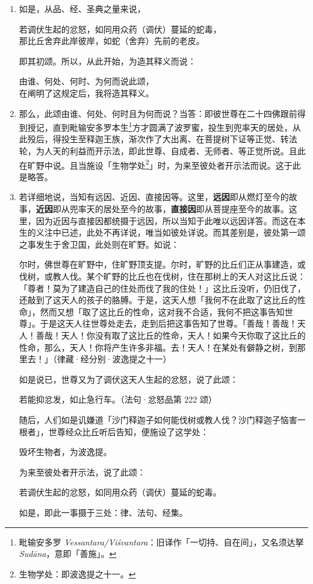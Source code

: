 \begin{enumerate}\item 如是，从品、经、圣典之量来说，\begin{quoting}若调伏生起的忿怒，如同用众药（调伏）蔓延的蛇毒，\\那比丘舍弃此岸彼岸，如蛇（舍弃）先前的老皮。\end{quoting}即其初颂。所以，从此开始，为造其释义而说：\begin{quoting}由谁、何处、何时、为何而说此颂，\\在阐明了这规定后，我将造其释义。\end{quoting}
\item 那么，此颂由谁、何处、何时且为何而说？当答：即彼世尊在二十四佛跟前得到授记，直到毗输安多罗本生\footnote{毗输安多罗 \textit{Vessantara/Viśvantara}：旧译作「一切持、自在间」，又名须达拏 \textit{Sudāna}，意即「善施」。}方才圆满了波罗蜜，投生到兜率天的居处，从此殁后，得投生至释迦王族，渐次作了大出离、在菩提树下证等正觉、转法轮，为人天的利益而开示法，即此世尊、自成者、无师者、等正觉所说。且此在旷野中说。且当施设「生物学处\footnote{生物学处：即波逸提之十一。}」时，为来至彼处者开示法而说。这于此是略答。
\item 若详细地说，当知有远因、近因、直接因等。这里，\textbf{远因}即从燃灯至今的故事，\textbf{近因}即从兜率天的居处至今的故事，\textbf{直接因}即从菩提座至今的故事。这里，因为近因与直接因都统摄于远因，所以当知于此唯以远因详答。而这在本生的义注中已述，此处不再详说，唯当如彼处详说。而其差别是，彼处第一颂之事发生于舍卫国，此处则在旷野。如说：\begin{quoting}尔时，佛世尊在旷野中，住旷野顶支提。尔时，旷野的比丘们正从事建造，或伐树，或教人伐。某个旷野的比丘也在伐树，住在那树上的天人对这比丘说：「尊者！莫为了建造自己的住处而伐了我的住处！」这比丘没听，仍旧伐了，还敲到了这天人的孩子的胳膊。于是，这天人想「我何不在此取了这比丘的性命」，然而又想「取了这比丘的性命，这对我不合适，我何不把这事告知世尊」。于是这天人往世尊处走去，走到后把这事告知了世尊。「善哉！善哉！天人！善哉！天人！你没有取了这比丘的性命，天人！如果今天你取了这比丘的性命，那么，天人！你将产生许多非福。去！天人！在某处有僻静之树，到那里去！」（律藏·经分别·波逸提之十一）\end{quoting}如是说已，世尊又为了调伏这天人生起的忿怒，说了此颂：\begin{quoting}若能抑忿发，如止急行车。（法句·忿怒品第 222 颂）\end{quoting}随后，人们如是讥嫌道「沙门释迦子如何能伐树或教人伐？沙门释迦子恼害一根者」，世尊经众比丘听后告知，便施设了这学处：\begin{quoting}毁坏生物者，为波逸提。\end{quoting}为来至彼处者开示法，说了此颂：\begin{quoting}若调伏生起的忿怒，如同用众药（调伏）蔓延的蛇毒。\end{quoting}如是，即此一事摄于三处：律、法句、经集。

\end{enumerate}
